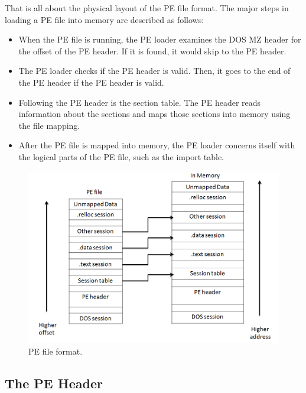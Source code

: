 That is all about the physical layout of the PE file format. The major steps in loading a PE file into memory are described as follows:

\begin{itemize}
\item When the PE file is running, the PE loader examines the DOS MZ header for the offset of the PE header. If it is found, it would skip to the PE header.
\item The PE loader checks if the PE header is valid. Then, it goes to the end of the PE header if the PE header is valid.
\item Following the PE header is the section table. The PE header reads information about the sections and maps those sections into memory using the file mapping.
\item After the PE file is mapped into memory, the PE loader concerns itself with the logical parts of the PE file, such as the import table.
\end{itemize}
\begin{figure}[h!]
\centering
\includegraphics[width=1\textwidth]{graph/pe1.png}
\caption{PE file format.}
\label{fig:pe1}
\end{figure}


\subsection{The PE Header}


